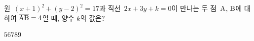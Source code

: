 원~$(x+1)^2+(y-2)^2=17$과 직선~$2x+3y+k=0$이 만나는 두 점~$\mathrm{A}$, $\mathrm{B}$에 대하여 $\overline{\mathrm{AB}}=4$일 때, 양수 $k$의 값은?
\begin{choices32}{$5$}{$6$}{$7$}{$8$}{$9$}\end{choices32}
